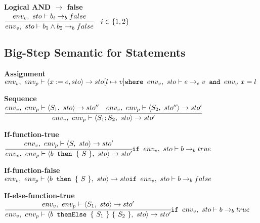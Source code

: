 \textbf{Logical AND $\rightarrow$ false}\\
\begin{math}
	\cfrac
		{env_v,\ sto \vdash b_i \rightarrow_b false}
		{env_v,\ sto \vdash b_1 \wedge b_2 \rightarrow_b false} \quad i \in \{1,2\}
\end{math}





\subsection{Big-Step Semantic for Statements}
\textbf{Assignment}\\
\begin{math}
	env_v,\ env_p \vdash \langle x := e, sto \rangle \rightarrow sto[l \mapsto v]\\
	\texttt{where } env_v,\ sto \vdash e \rightarrow_e v
	\texttt{ and } env_v\ x = l
\end{math}

\textbf{Sequence}\\
\begin{math}
	\cfrac
		{env_v,\ env_p \vdash \langle S_1,\ sto \rangle \rightarrow sto'' \quad env_v,\ env_p \vdash \langle S_2,\ sto'' \rangle \rightarrow sto'}
		{env_v,\ env_p \vdash \langle S_1;S_2,\ sto \rangle \rightarrow sto'}
\end{math}

\textbf{If-function-true}\\
\begin{math}
	\cfrac
		{env_v,\ env_p \vdash \langle S,\ sto \rangle \rightarrow sto'}
		{env_v,\ env_p \vdash \langle b \texttt{ then } \{\ S\ \},\ sto \rangle \rightarrow sto'}\\
	\texttt{if } env_v,\ sto \vdash b \rightarrow_b true
\end{math}

\textbf{If-function-false}\\
\begin{math}
	env_v,\ env_p \vdash \langle b \texttt{ then } \{\ S\ \},\ sto \rangle \rightarrow sto\\
	\texttt{if } env_v,\ sto \vdash b \rightarrow_b false
\end{math}

\textbf{If-else-function-true}\\
\begin{math}
	\cfrac
		{env_v,\ env_p \vdash \langle S_1,\ sto \rangle \rightarrow sto'}
		{env_v,\ env_p \vdash \langle b \texttt{ thenElse } \{\ S_1\ \}\ \{\ S_2\ \},\ sto \rangle \rightarrow sto'}\\
	\texttt{if } env_v,\ sto \vdash b \rightarrow_b true
\end{math}

